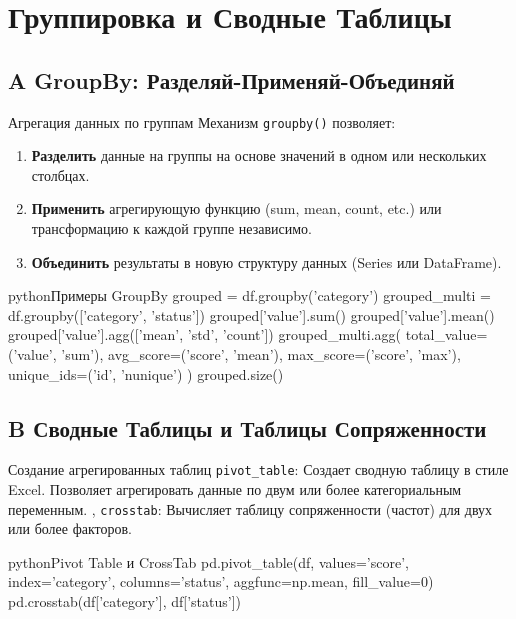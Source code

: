 \section{Группировка и Сводные Таблицы}

\subsection{A GroupBy: Разделяй-Применяй-Объединяй}

\begin{myblock}{Агрегация данных по группам}
    Механизм \texttt{groupby()} позволяет:
    \begin{enumerate}[nosep, leftmargin=*]
        \item \textbf{Разделить} данные на группы на основе значений в одном или нескольких столбцах.
        \item \textbf{Применить} агрегирующую функцию (sum, mean, count, etc.) или трансформацию к каждой группе независимо.
        \item \textbf{Объединить} результаты в новую структуру данных (Series или DataFrame).
    \end{enumerate}
    \begin{codebox}{python}{Примеры GroupBy}
    grouped = df.groupby('category')
    grouped_multi = df.groupby(['category', 'status'])
    grouped['value'].sum()
    grouped['value'].mean()
    grouped['value'].agg(['mean', 'std', 'count'])
    grouped_multi.agg(
        total_value=('value', 'sum'),
        avg_score=('score', 'mean'),
        max_score=('score', 'max'),
        unique_ids=('id', 'nunique')
    )
    grouped.size()
    \end{codebox}
\end{myblock}

\subsection{B Сводные Таблицы и Таблицы Сопряженности}

\begin{myblock}{Создание агрегированных таблиц}
    \texttt{pivot\_table}: Создает сводную таблицу в стиле Excel. Позволяет агрегировать данные по двум или более категориальным переменным. \sep
    \texttt{crosstab}: Вычисляет таблицу сопряженности (частот) для двух или более факторов.
    \begin{codebox}{python}{Pivot Table и CrossTab}
    pd.pivot_table(df,
                   values='score',
                   index='category',
                   columns='status',
                   aggfunc=np.mean,
                   fill_value=0)
    pd.crosstab(df['category'], df['status'])
    \end{codebox}
\end{myblock}

